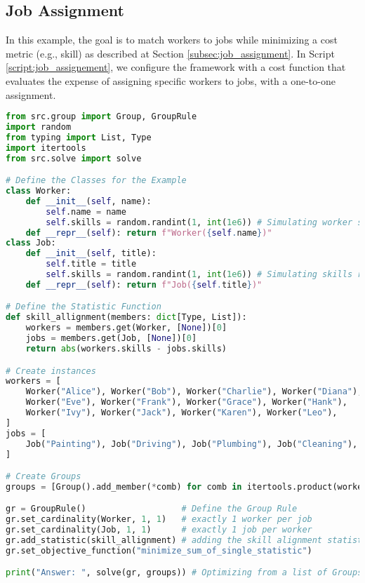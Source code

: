\subsection{Job Assignment}
In this example, the goal is to match workers to jobs while minimizing a cost metric (e.g., skill) as described at Section \ref{subsec:job_assignment}.
In Script \ref{script:job_assignement}, we configure the framework with a cost function that evaluates the expense of assigning specific workers to jobs, with a one-to-one assignment.

\begin{lstlisting}[language=Python, caption={Creating and solving the Job Assignment Problem using this framework.}, label={script:job_assignement}]
from src.group import Group, GroupRule
import random
from typing import List, Type
import itertools
from src.solve import solve

# Define the Classes for the Example
class Worker:
    def __init__(self, name):
        self.name = name
        self.skills = random.randint(1, int(1e6)) # Simulating worker skill level
    def __repr__(self): return f"Worker({self.name})"
class Job:
    def __init__(self, title):
        self.title = title
        self.skills = random.randint(1, int(1e6)) # Simulating skills required
    def __repr__(self): return f"Job({self.title})"

# Define the Statistic Function
def skill_allignment(members: dict[Type, List]):
    workers = members.get(Worker, [None])[0]
    jobs = members.get(Job, [None])[0]
    return abs(workers.skills - jobs.skills)

# Create instances
workers = [
    Worker("Alice"), Worker("Bob"), Worker("Charlie"), Worker("Diana"),
    Worker("Eve"), Worker("Frank"), Worker("Grace"), Worker("Hank"),
    Worker("Ivy"), Worker("Jack"), Worker("Karen"), Worker("Leo"),
]
jobs = [
    Job("Painting"), Job("Driving"), Job("Plumbing"), Job("Cleaning"), Job("Gardening")
]

# Create Groups
groups = [Group().add_member(*comb) for comb in itertools.product(workers, jobs)]

gr = GroupRule()                   # Define the Group Rule
gr.set_cardinality(Worker, 1, 1)   # exactly 1 worker per job
gr.set_cardinality(Job, 1, 1)      # exactly 1 job per worker
gr.add_statistic(skill_allignment) # adding the skill alignment statistic
gr.set_objective_function("minimize_sum_of_single_statistic")

print("Answer: ", solve(gr, groups)) # Optimizing from a list of Groups
\end{lstlisting}


